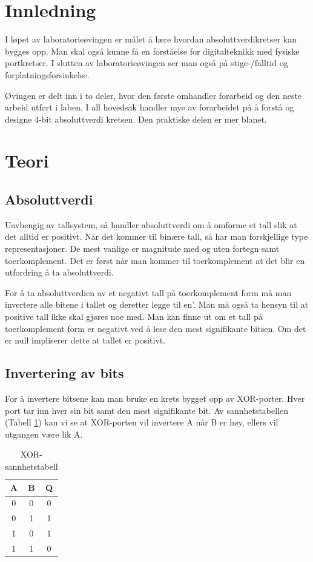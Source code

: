\documentclass{article}
\begin{document}
\listoffigures

\listoftables

\newpage
{}

\section{Innledning}
I løpet av laboratorieøvingen er målet å lære hvordan absoluttverdikretser kan bygges opp. Man skal også kunne få en forståelse for digitalteknikk med fysiske portkretser. I slutten av laboratorieøvingen ser man også på stige-/falltid og forplatningsforsinkelse.

Øvingen er delt inn i to deler, hvor den første omhandler forarbeid og den neste arbeid utført i laben. I all hovedsak handler mye av forarbeidet på å forstå og designe 4-bit absoluttverdi kretsen. Den praktiske delen er mer blanet.
\section{Teori}
\subsection{Absoluttverdi}
Uavhengig av tallsystem, så handler absoluttverdi om å omforme et tall slik at det alltid er positivt. Når det kommer til binære tall, så har man forskjellige type representasjoner. De mest vanlige er magnitude med og uten fortegn samt toerkomplement. Det er først når man kommer til toerkomplement at det blir en utfordring å ta absoluttverdi.

For å ta absoluttverdien av et negativt tall på toerkomplement form må man invertere alle bitene i tallet og deretter legge til en’. Man må også ta hensyn til at positive tall ikke skal gjøres noe med. Man kan finne ut om et tall på toerkomplement form er negativt ved å lese den mest signifikante bitsen. Om det er null impliserer dette at tallet er positivt.

\subsection{Invertering av bits}
For å invertere bitsene kan man bruke en krets bygget opp av XOR-porter. Hver port tar inn hver sin bit samt den mest signifikante bit. Av sannhetstabellen (Tabell \ref{truth-label}) kan vi se at XOR-porten vil invertere A når B er høy, ellers vil utgangen være lik A.

\begin{table}[h]
	\centering
	\caption{XOR-sannhetstabell}
	\label{truth-label}

	\vspace{0.2cm}
	\begin{tabular}{| c | c | c |} \hline
		A & B & Q \\ \hline
		0 & 0 & 0 \\ \hline
		0 & 1 & 1 \\ \hline
		1 & 0 & 1 \\ \hline
		1 & 1 & 0 \\ \hline
	\end{tabular}
\end{table}
\end{document}
